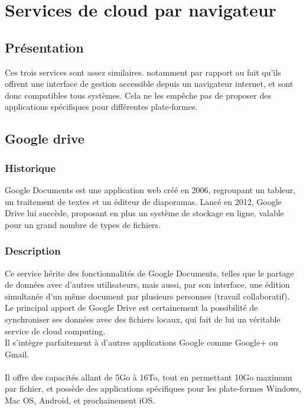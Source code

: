 \chapter{Services de cloud par navigateur}
\thispagestyle{EIP} %

\section{Présentation}
Ces trois services sont assez similaires. notamment par rapport au fait qu'ils offrent une interface de gestion accessible depuis un navigateur internet, et sont donc compatibles tous systèmes. Cela ne les empêche pas de proposer des applications spécifiques pour différentes plate-formes.


\section{Google drive}

\subsection{Historique}
Google Documents est une application web créé en 2006, regroupant un tableur, un traitement de textes et un éditeur de diaporamas.
Lancé en 2012, Google Drive lui succède, proposant en plus un système de stockage en ligne, valable pour un grand nombre de types de fichiers.\\

\subsection{Description}
Ce service hérite des fonctionnalités de Google Documents, telles que le partage de données avec d'autres utilisateurs, mais aussi, par son interface, une édition simultanée d'un même document par plusieurs personnes (travail collaboratif).\\
Le principal apport de Google Drive est certainement la possibilité de synchroniser ses données avec des fichiers locaux, qui fait de lui un véritable service de cloud computing.\\
Il s'intègre parfaitement à d'autres applications Google comme Google+ ou Gmail.\\
\\
Il offre des capacités allant de 5Go à 16To, tout en permettant 10Go maximum par fichier, et possède des applications spécifiques pour les plate-formes Windows, Mac OS, Android, et prochainement iOS.\\


